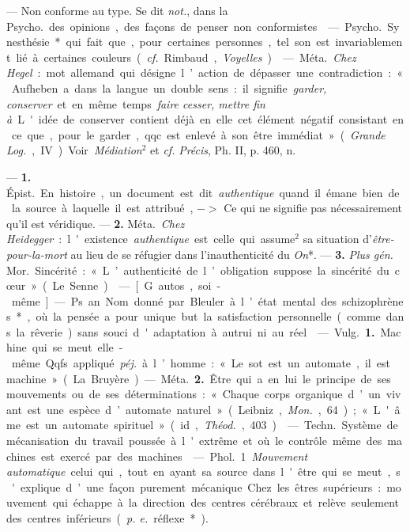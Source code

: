 \begin{itemize}[leftmargin=1cm, label=, itemsep=1pt]
 — Non conforme au type.
Se dit {\it not.}, dans la \si{Psycho.} des opinions, des façons de penser non
conformistes.

 — \si{Psycho.} Synesthésie* qui fait que, pour certaines
personnes, tel son est invariablement lié à certaines couleurs ({\it cf.} 
Rimbaud, {\it Voyelles}).

 — \si{Méta.} {\it Chez Hegel} : mot
allemand qui désigne l’action de
dépasser une contradiction : « Aufheben a dans la langue un double
sens : il signifie {\it garder, conserver} et
en même temps {\it faire cesser, mettre
fin à}. L'idée de conserver contient
déjà en elle cet élément négatif
consistant en ce que, pour le garder,
qqc est enlevé à son être immédiat »
({\it Grande \si{Log.}}, IV). Voir {\it Médiation}$^2$
et {\it cf.}  {\it Précis}, Ph. II, p. 460, n.

 —  {\bf 1.} \si{Épist.}
En histoire, un document est dit
{\it authentique} quand il émane bien de
la source à laquelle il est attribué,
$->$ Ce qui ne signifie pas nécessairement qu'il est véridique. —  {\bf 2.}
\si{Méta.} {\it Chez Heidegger} : l'existence
{\it authentique} est celle qui assume$^2$
sa situation d'{\it être-pour-la-mort} au
lieu de se réfugier dans l’inauthenticité du {\it On}*. — {\bf 3.} {\it Plus  {\it gén.}} \si{Mor.}
Sincérité : « L’authenticité de l’obligation suppose la sincérité du cœur »
(Le Senne).

 — [G. autos, soi-même] — Ps.
an. Nom donné par Bleuler à l’état
mental des schizophrènes*, où la
pensée a pour unique but la satisfaction personnelle (comme dans la
rêverie) sans souci d'adaptation à
autrui ni au réel.

 — \si{Vulg.} {\bf 1.} Machine qui se
meut elle-même. Qqfs. appliqué {\it péj.}
à l’homme : « Le sot est un automate,
il est machine » (La Bruyère).

— \si{Méta.} {\bf 2.} Être qui a en lui le
principe de ses mouvements ou de
ses déterminations : « Chaque corps
organique d’un vivant est une espèce
d’automate naturel » (Leibniz, {\it Mon.},
64); « L'âme est un automate spirituel » (id., {\it Théod.}, 403).

 — \si{Techn.} Système de
mécanisation du travail poussée à
l'extrême et où le contrôle même
des machines est exercé par des
machines.

 — \si{Phol.} 1 {\it Mouvement
automatique} celui qui, tout en
ayant sa source dans l'être qui se
meut, s'explique d’une façon purement mécanique. Chez les êtres
supérieurs : mouvement qui échappe
à la direction des centres cérébraux
et relève seulement des centres inférieurs ({\it p. e.} réflexe*).


\end{itemize}
